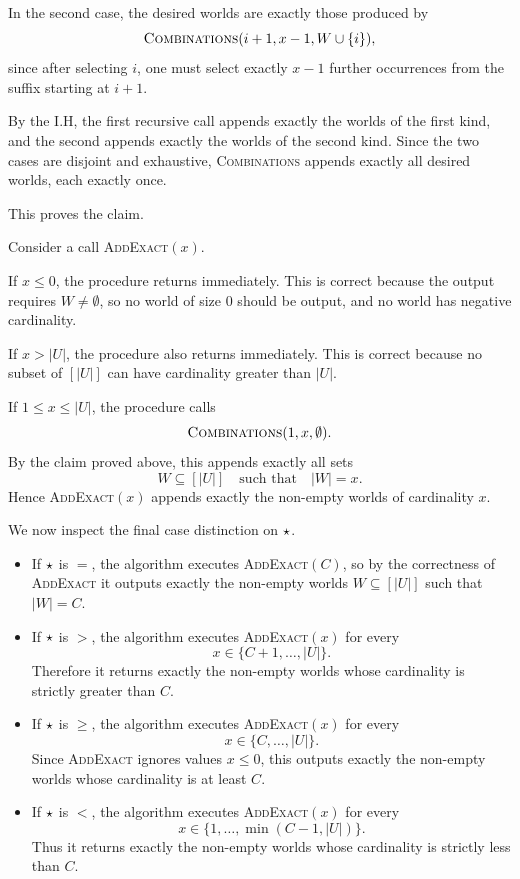 \begin{appendixproof}
In the second case, the desired worlds are exactly those produced by
\[
\textsc{Combinations}(i+1,x-1,W\cup\{i\}),
\]
since after selecting $i$, one must select exactly $x-1$ further occurrences from the suffix starting at $i+1$.

By the I.H, the first recursive call appends exactly the worlds of the first kind, and the second appends exactly the worlds of the second kind. Since the two cases are disjoint and exhaustive, \textsc{Combinations} appends exactly all desired worlds, each exactly once.

This proves the claim.

Consider a call \textsc{AddExact}$(x)$.

If $x\le 0$, the procedure returns immediately. This is correct because the output requires $W\neq\emptyset$, so no world of size $0$ should be output, and no world has negative cardinality.

If $x>|U|$, the procedure also returns immediately. This is correct because no subset of $[|U|]$ can have cardinality greater than $|U|$.

If $1\le x\le |U|$, the procedure calls
\[
\textsc{Combinations}(1,x,\emptyset).
\]
By the claim proved above, this appends exactly all sets
\[
  W\subseteq [|U|]
\quad\text{such that}\quad
|W|=x.
\]
Hence \textsc{AddExact}$(x)$ appends exactly the non-empty worlds of cardinality $x$.

We now inspect the final case distinction on $\mathbin{\mathsf{\star}}$.

\begin{itemize}
  \item If $\mathbin{\mathsf{\star}}$ is $=$, the algorithm executes \textsc{AddExact}$(C)$, so by the correctness of \textsc{AddExact} it outputs exactly the non-empty worlds $W\subseteq [|U|]$ such that $|W|=C$.

\item If $\mathbin{\mathsf{\star}}$ is $>$, the algorithm executes \textsc{AddExact}$(x)$ for every
\[
x\in\{C+1,\dots,|U|\}.
\]
Therefore it returns exactly the non-empty worlds whose cardinality is strictly greater than $C$.

\item If $\mathbin{\mathsf{\star}}$ is $\ge$, the algorithm executes \textsc{AddExact}$(x)$ for every
\[
x\in\{C,\dots,|U|\}.
\]
Since \textsc{AddExact} ignores values $x\le 0$, this outputs exactly the non-empty worlds whose cardinality is at least $C$.

\item If $\mathbin{\mathsf{\star}}$ is $<$, the algorithm executes \textsc{AddExact}$(x)$ for every
\[
x\in\{1,\dots,\min(C-1,|U|)\}.
\]
Thus it returns exactly the non-empty worlds whose cardinality is strictly less than $C$.


\end{itemize}
\end{appendixproof}
